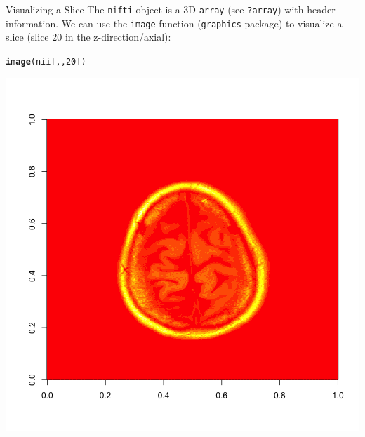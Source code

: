 \documentclass[11pt]{beamer}\usepackage[]{graphicx}\usepackage[]{color}
\makeatletter
\newcommand{\hlnum}[1]{\textcolor[rgb]{0.686,0.059,0.569}{#1}}%
\newcommand{\hlstd}[1]{\textcolor[rgb]{0.345,0.345,0.345}{#1}}%
\newcommand{\hlkwd}[1]{\textcolor[rgb]{0.737,0.353,0.396}{\textbf{#1}}}%
\newenvironment{kframe}{%
 \def\at@end@of@kframe{}%
 \ifinner\ifhmode%
  \def\at@end@of@kframe{\end{minipage}}%
  \begin{minipage}{\columnwidth}%
 \fi\fi%
 \def\FrameCommand##1{\hskip\@totalleftmargin \hskip-\fboxsep
 \colorbox{shadecolor}{##1}\hskip-\fboxsep
     \hskip-\linewidth \hskip-\@totalleftmargin \hskip\columnwidth}%
 \MakeFramed {\advance\hsize-\width
   \@totalleftmargin\z@ \linewidth\hsize
   \@setminipage}}%
 {\par\unskip\endMakeFramed%
 \at@end@of@kframe}
\newenvironment{knitrout}{}{} %
\makeatother
\begin{document}
\begin{frame}[fragile]{Visualizing a Slice}
The \verb|nifti| object is a 3D \verb|array| (see \verb|?array|) with header information.  We can use the \verb|image| function (\verb|graphics| package) to visualize a slice (slice 20 in the z-direction/axial):

\begin{center}
\begin{knitrout}
\color{fgcolor}\begin{kframe}
\begin{alltt}
\hlkwd{image}\hlstd{(nii[,,}\hlnum{20}\hlstd{])}
\end{alltt}
\end{kframe}
\includegraphics[width=\textwidth,height=0.5\textheight,keepaspectratio]{figure/image1-1} 

\end{knitrout}
\end{center}

\end{frame}
\end{document}
